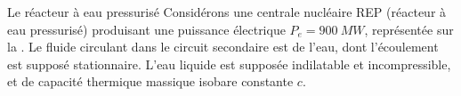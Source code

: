 \begin{exo}[PC][2]{Le réacteur à eau pressurisé}
Considérons une centrale nucléaire REP (réacteur à eau pressurisé) produisant une puissance électrique $P_e = \SI{900}{MW}$, représentée sur la . Le fluide circulant dans le circuit secondaire est de l’eau, dont l’écoulement est supposé stationnaire. L’eau liquide est supposée indilatable et incompressible, et de capacité thermique massique isobare constante $c$.


\end{exo}
